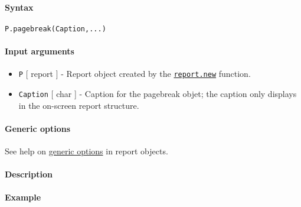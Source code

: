 


	\paragraph{Syntax}

\begin{verbatim}
P.pagebreak(Caption,...)
\end{verbatim}

\paragraph{Input arguments}

\begin{itemize}
\item
  \texttt{P} {[} report {]} - Report object created by the
  \href{report/new}{\texttt{report.new}} function.
\item
  \texttt{Caption} {[} char {]} - Caption for the pagebreak objet; the
  caption only displays in the on-screen report structure.
\end{itemize}

\paragraph{Generic options}

See help on \href{report/Contents}{generic options} in report objects.

\paragraph{Description}

\paragraph{Example}


